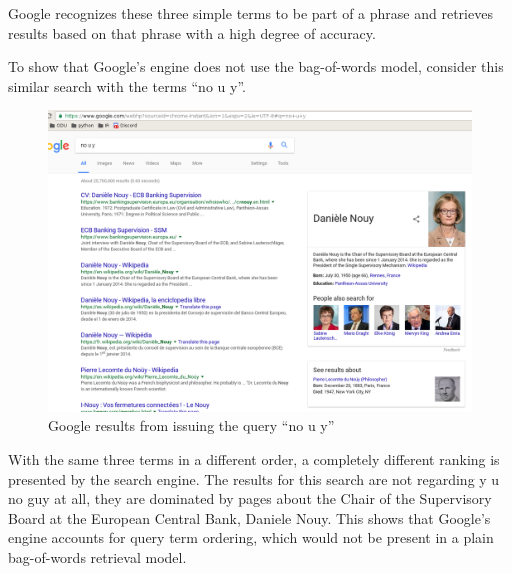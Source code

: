 Google recognizes these three simple terms to be part of a phrase and retrieves results based on that phrase with a high degree of accuracy.

\clearpage

To show that Google's engine does not use the bag-of-words model, consider this similar search with the terms ``no u y''.

\begin{figure}[H]
\centering
\label{fig:nouy}
\includegraphics[scale=.35]{q11.2/nouy.png}
\caption{Google results from issuing the query ``no u y''}
\end{figure}

With the same three terms in a different order, a completely different ranking is presented by the search engine.  The results for this search are not regarding y u no guy at all, they are dominated by pages about the Chair of the Supervisory Board at the European Central Bank, Daniele Nouy.  This shows that Google's engine accounts for query term ordering, which would not be present in a plain bag-of-words retrieval model.
